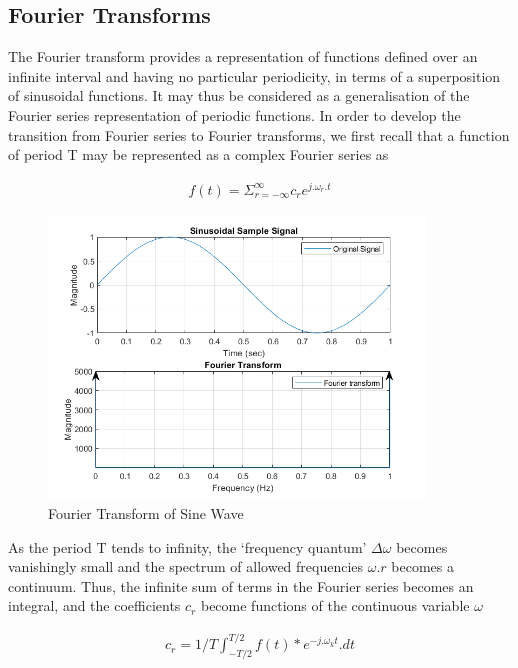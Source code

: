 \documentclass{article}
\begin{document}
\subsection{Fourier Transforms}
The Fourier transform provides a representation of functions defined over an infinite interval and having no particular periodicity, in terms of a superposition of sinusoidal functions. It may thus be considered as a generalisation of the Fourier series representation of periodic functions. In order to develop the transition from Fourier series to Fourier transforms, we first recall that a function of period T may be represented as a complex Fourier series as 

\begin{equation}
\begin{aligned}
     f(t) = \Sigma_{r = -\infty}^{\infty} c_r e^{j.\omega_r.t}
\end{aligned}
\label{eq:complex_1}
\end{equation}

\begin{figure}[htbp]
        \begin{center}
    	\includegraphics[width=100mm, angle=0,rotate=0]{figures/Fourier_Transform.png}
        \end{center}
        \caption{Fourier Transform of Sine Wave}
\end{figure}

As the period T tends to infinity, the ‘frequency quantum' $\Delta \omega$ becomes vanishingly small and the spectrum of allowed frequencies $\omega.r$ becomes a continuum. Thus, the infinite sum of terms in the Fourier series becomes an integral, and the coefficients $c_r$ become functions of the continuous variable $\omega$

\begin{equation}
\begin{aligned}
     c_r = 1/T \int_{-T/2}^{T/2} f(t) * e^{-j.\omega_k t} . dt
\end{aligned}
\label{eq:complex_2}
\end{equation}
\end{document}
